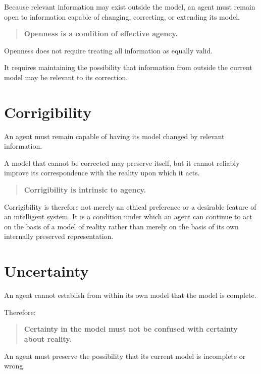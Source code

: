 \documentclass[11pt,a4paper]{article}
\begin{document}
Because relevant information may exist outside the model, an agent must
remain open to information capable of changing, correcting, or extending
its model.

\begin{quote}
\textbf{Openness is a condition of effective agency.}
\end{quote}

Openness does not require treating all information as equally valid.

It requires maintaining the possibility that information from outside the
current model may be relevant to its correction.


\section{Corrigibility}

An agent must remain capable of having its model changed by relevant
information.

A model that cannot be corrected may preserve itself, but it cannot
reliably improve its correspondence with the reality upon which it acts.

\begin{quote}
\textbf{Corrigibility is intrinsic to agency.}
\end{quote}

Corrigibility is therefore not merely an ethical preference or a desirable
feature of an intelligent system. It is a condition under which an agent can
continue to act on the basis of a model of reality rather than merely on the
basis of its own internally preserved representation.


\section{Uncertainty}

An agent cannot establish from within its own model that the model is
complete.

Therefore:

\begin{quote}
\textbf{Certainty in the model must not be confused with certainty about
reality.}
\end{quote}

An agent must preserve the possibility that its current model is incomplete
or wrong.
\end{document}
